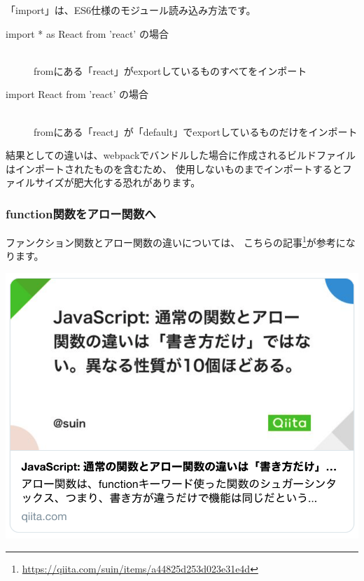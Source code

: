 \begin{reviewcolumn}
\hypertarget{column:03-todo-with-react:1}{}

「import」は、ES6仕様のモジュール読み込み方法です。

\vspace*{\baselineskip}

\begin{description}
\item[import * as React from 'react' の場合] \mbox{} \\
fromにある「react」がexportしているものすべてをインポート
\item[import React from 'react' の場合] \mbox{} \\
fromにある「react」が「default」でexportしているものだけをインポート
\end{description}

\vspace*{\baselineskip}

結果としての違いは、webpackでバンドルした場合に作成されるビルドファイルはインポートされたものを含むため、
使用しないものまでインポートするとファイルサイズが肥大化する恐れがあります。

\end{reviewcolumn}


\subsubsection*{function関数をアロー関数へ}
\keeplastskip{
  \label{sec:3-3-4-1}
  \label{sec-00332-2}
  \par\nobreak
}

ファンクション関数とアロー関数の違いについては、
こちらの記事\footnote{\url{https://qiita.com/suin/items/a44825d253d023e31e4d}}が参考になります。

\begin{reviewimage}%
\includegraphics[width=0.5\maxwidth]{./images/03-todo-with-react/sec00332-1-01.png}%
\label{image:03-todo-with-react:sec00332-1-01}
\end{reviewimage}

